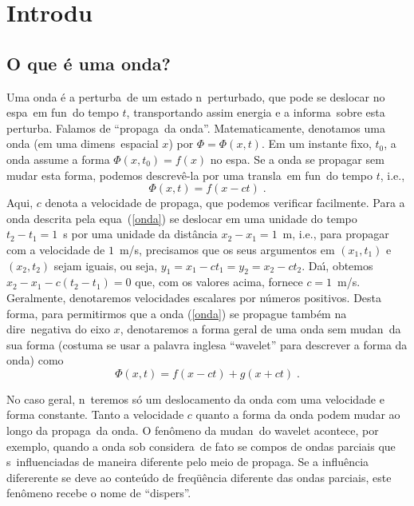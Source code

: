 
\chapter{Introdu\cao}

\section{O que \'e uma onda?}

Uma onda \'e a perturba\cao\ de um estado n\ao\ perturbado, que pode se
deslocar no espa\co\ em fun\cao\ do tempo $t$, transportando assim energia
e a informa\cao\ sobre esta perturba\cao. Falamos de ``propaga\cao\ da
onda''. Matematicamente, denotamos uma
onda (em uma dimens\ao\ espacial $x$) por $\Phi = \Phi(x,t)$. Em um instante
fixo, $t_0$, a onda assume a forma $\Phi(x,t_0) = f(x)$ no espa\co.
Se a onda se propagar sem mudar esta forma, podemos descrev\^e-la por
uma transla\cao\ em fun\cao\ do tempo $t$, i.e., 
\begin{equation}
\Phi(x,t) = f(x-ct) \; .
\label{onda}
\end{equation}
Aqui, $c$ denota a velocidade de propaga\cao, que podemos verificar
facilmente. Para a onda descrita pela equa\cao\ (\ref{onda}) se deslocar
em uma unidade do tempo $t_2-t_1 = 1$~s por uma unidade da dist\^ancia
$x_2-x_1 = 1$~m, i.e., para propagar com a velocidade de $1$~m/s,
precisamos que os seus argumentos em $(x_1,t_1)$ e $(x_2,t_2)$ sejam
iguais, ou seja, $y_1=x_1-ct_1=y_2=x_2-ct_2$. Da\'{\i}, obtemos $x_2-x_1
- c(t_2-t_1) = 0$ que, com os valores acima, fornece $c=1$~m/s.
Geralmente, denotaremos velocidades escalares por n\'umeros positivos.
Desta forma, para permitirmos que a onda (\ref{onda}) se propague
tamb\'em na dire\cao\ negativa do eixo $x$, denotaremos a forma geral de
uma onda sem mudan\ca\ da sua forma (costuma se usar a palavra inglesa
``wavelet'' para descrever a forma da onda) como
\begin{equation}
\Phi(x,t) = f(x-ct) + g(x+ct) \; .
\label{onda2}
\end{equation}

No caso geral, n\ao\ teremos s\'o um deslocamento da onda com uma
velocidade e forma constante. Tanto a velocidade $c$ quanto a forma da
onda podem mudar ao longo da propaga\cao\ da onda. O fen\^omeno da
mudan\ca\ do wavelet acontece, por exemplo, quando a onda sob
considera\cao\ de fato se compos de ondas parciais que s\ao\
influenciadas de maneira diferente pelo meio de propaga\cao. Se a
influ\^encia difererente se deve ao conte\'udo de freq\"u\^encia
diferente das ondas parciais, este fen\^omeno recebe o nome de
``dispers\ao''.

